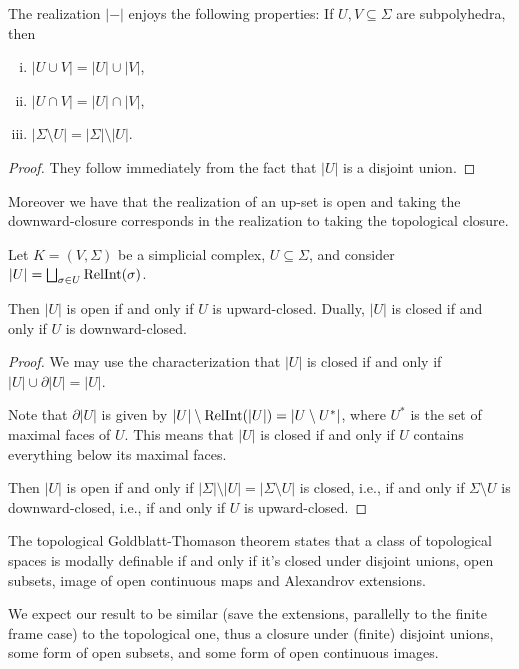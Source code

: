 \begin{proposition}
    The realization $|-|$ enjoys the following properties:
    If $U,V\subseteq \Sigma$ are subpolyhedra, then 
    \begin{enumerate}[(i)]
        \item $|U\cup V|=|U|\cup|V|$,
        \item $|U\cap V|=|U|\cap |V|$,
        \item $|\Sigma\setminus U|=|\Sigma|\setminus |U|$.
    \end{enumerate}
\end{proposition}
\begin{proof}
    They follow immediately from the fact that $|U|$ is a disjoint union.
\end{proof}
Moreover we have that the realization of an up-set is open and taking the downward-closure corresponds in the realization to taking the topological closure.
\begin{lemma}
    Let $K=(V,\Sigma)$ be a simplicial complex, $U\subseteq \Sigma$, and consider $|U|=\bigsqcup_{\sigma\in U}\operatorname{RelInt}(\sigma)$.

    Then $|U|$ is open if and only if $U$ is upward-closed. Dually, $|U|$ is closed if and only if $U$ is downward-closed.
\end{lemma}
\begin{proof}
    We may use the characterization that $|U|$ is closed if and only if $|U|\cup\partial |U|=|U|$.

    Note that $\partial |U|$ is given by $|U|\setminus \operatorname{RelInt}(|U|)=|U\setminus U^*|$, where $U^*$ is the set of maximal faces of $U$. This means that $|U|$ is closed if and only if $U$ contains everything below its maximal faces.

    Then $|U|$ is open if and only if $|\Sigma|\setminus|U|=|\Sigma\setminus U|$ is closed, i.e., if and only if $\Sigma\setminus U$ is downward-closed, i.e., if and only if $U$ is upward-closed.
\end{proof}

The topological Goldblatt-Thomason theorem states that a class of topological spaces is modally definable if and only 
if it's closed under disjoint unions, open subsets, image of open continuous maps and Alexandrov extensions.

We expect our result to be similar (save the extensions, parallelly to the finite frame case) to the topological one, thus a closure under 
(finite) disjoint unions, some form of open subsets, and some form of open continuous images.
